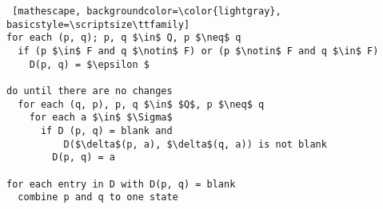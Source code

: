 \documentclass[
    border=0.2cm,
    convert={density=600}
]{standalone}
\begin{document}
\begin{lstlisting} [mathescape, backgroundcolor=\color{lightgray},
basicstyle=\scriptsize\ttfamily]
for each (p, q); p, q $\in$ Q, p $\neq$ q
  if (p $\in$ F and q $\notin$ F) or (p $\notin$ F and q $\in$ F)
    D(p, q) = $\epsilon $

do until there are no changes
  for each (q, p), p, q $\in$ $Q$, p $\neq$ q
    for each a $\in$ $\Sigma$
      if D (p, q) = blank and
          D($\delta$(p, a), $\delta$(q, a)) is not blank
        D(p, q) = a

for each entry in D with D(p, q) = blank
  combine p and q to one state
\end{lstlisting}
\end{document}

